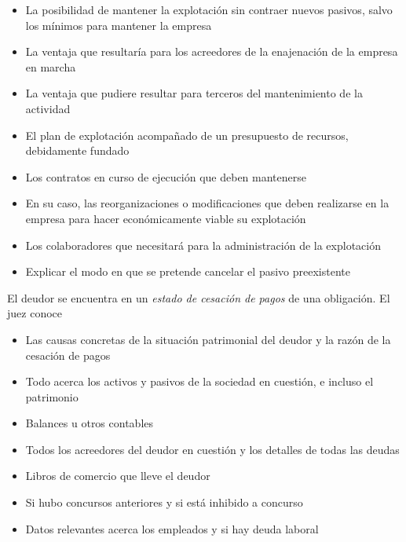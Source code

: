 \documentclass{article}
\begin{document}
\begin{itemize}
    \item La posibilidad de mantener la explotación sin contraer nuevos pasivos, salvo los mínimos para mantener la empresa
    \item La ventaja que resultaría para los acreedores de la enajenación de la empresa en marcha
    \item La ventaja que pudiere resultar para terceros del mantenimiento de la actividad
    \item El plan de explotación acompañado de un presupuesto de recursos, debidamente fundado
    \item Los contratos en curso de ejecución que deben mantenerse
    \item En su caso, las reorganizaciones o modificaciones que deben realizarse en la empresa para hacer económicamente viable su explotación
    \item Los colaboradores que necesitará para la administración de la explotación
    \item Explicar el modo en que se pretende cancelar el pasivo preexistente
\end{itemize}
El deudor se encuentra en un \textit{estado de cesación de pagos} de una obligación. El juez conoce
\begin{itemize}
\item Las causas concretas de la situación patrimonial del deudor y la razón de la cesación de pagos
\item Todo acerca los activos y pasivos de la sociedad en cuestión, e incluso el patrimonio
\item Balances u otros contables
\item Todos los acreedores del deudor en cuestión y los detalles de todas las deudas
\item Libros de comercio que lleve el deudor
\item Si hubo concursos anteriores y si está inhibido a concurso
\item Datos relevantes acerca los empleados y si hay deuda laboral
\end{itemize}
\end{document}
